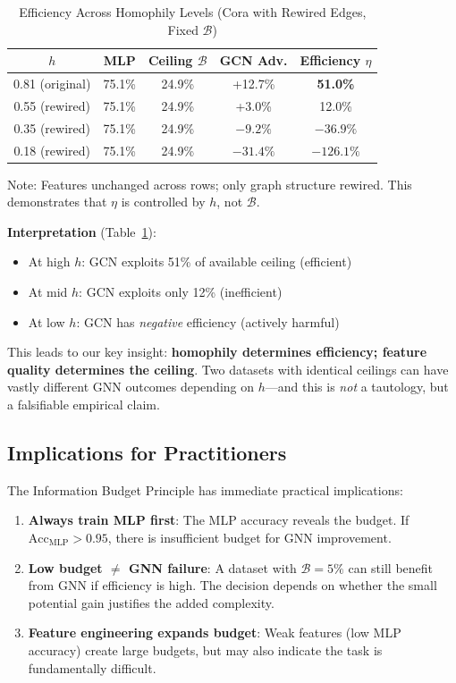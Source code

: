 \begin{table}[t]
\centering
\caption{Efficiency Across Homophily Levels (Cora with Rewired Edges, Fixed $\mathcal{B}$)}
\label{tab:budget_efficiency}
\begin{tabular}{@{}ccccc@{}}
\toprule
\textbf{$h$} & \textbf{MLP} & \textbf{Ceiling $\mathcal{B}$} & \textbf{GCN Adv.} & \textbf{Efficiency $\eta$} \\
\midrule
0.81 (original) & 75.1\% & 24.9\% & +12.7\% & \textbf{51.0\%} \\
0.55 (rewired) & 75.1\% & 24.9\% & +3.0\% & 12.0\% \\
0.35 (rewired) & 75.1\% & 24.9\% & $-9.2\%$ & $-36.9\%$ \\
0.18 (rewired) & 75.1\% & 24.9\% & $-31.4\%$ & $-126.1\%$ \\
\bottomrule
\end{tabular}
\vspace{1mm}
\raggedright\small Note: Features unchanged across rows; only graph structure rewired. This demonstrates that $\eta$ is controlled by $h$, not $\mathcal{B}$.
\end{table}

\textbf{Interpretation} (Table~\ref{tab:budget_efficiency}):
\begin{itemize}
    \item At high $h$: GCN exploits 51\% of available ceiling (efficient)
    \item At mid $h$: GCN exploits only 12\% (inefficient)
    \item At low $h$: GCN has \textit{negative} efficiency (actively harmful)
\end{itemize}

This leads to our key insight: \textbf{homophily determines efficiency; feature quality determines the ceiling}. Two datasets with identical ceilings can have vastly different GNN outcomes depending on $h$---and this is \textit{not} a tautology, but a falsifiable empirical claim.

\subsection{Implications for Practitioners}

The Information Budget Principle has immediate practical implications:

\begin{enumerate}
    \item \textbf{Always train MLP first}: The MLP accuracy reveals the budget. If $\text{Acc}_{\text{MLP}} > 0.95$, there is insufficient budget for GNN improvement.

    \item \textbf{Low budget $\neq$ GNN failure}: A dataset with $\mathcal{B} = 5\%$ can still benefit from GNN if efficiency is high. The decision depends on whether the small potential gain justifies the added complexity.

    \item \textbf{Feature engineering expands budget}: Weak features (low MLP accuracy) create large budgets, but may also indicate the task is fundamentally difficult.
\end{enumerate}
